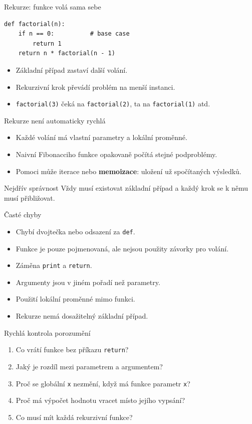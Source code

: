 \documentclass[aspectratio=169]{beamer}
\newcommand{\term}[1]{\textcolor{CodeBlue}{\textbf{#1}}}
\begin{document}
\begin{frame}[fragile]{Rekurze: funkce volá sama sebe}
\begin{lstlisting}[style=python]
def factorial(n):
    if n == 0:          # base case
        return 1
    return n * factorial(n - 1)
\end{lstlisting}
  \begin{itemize}
    \item Základní případ zastaví další volání.
    \item Rekurzivní krok převádí problém na menší instanci.
    \item \texttt{factorial(3)} čeká na \texttt{factorial(2)}, ta na \texttt{factorial(1)} atd.
  \end{itemize}
\end{frame}

\begin{frame}{Rekurze není automaticky rychlá}
  \begin{itemize}
    \item Každé volání má vlastní parametry a lokální proměnné.
    \item Naivní Fibonacciho funkce opakovaně počítá stejné podproblémy.
    \item Pomoci může iterace nebo \term{memoizace}: uložení už spočítaných výsledků.
  \end{itemize}
  \begin{alertblock}{Nejdřív správnost}
    Vždy musí existovat základní případ a každý krok se k němu musí přibližovat.
  \end{alertblock}
\end{frame}

\begin{frame}{Časté chyby}
  \begin{itemize}
    \item Chybí dvojtečka nebo odsazení za \texttt{def}.
    \item Funkce je pouze pojmenovaná, ale nejsou použity závorky pro volání.
    \item Záměna \texttt{print} a \texttt{return}.
    \item Argumenty jsou v jiném pořadí než parametry.
    \item Použití lokální proměnné mimo funkci.
    \item Rekurze nemá dosažitelný základní případ.
  \end{itemize}
\end{frame}

\begin{frame}{Rychlá kontrola porozumění}
  \begin{enumerate}
    \item Co vrátí funkce bez příkazu \texttt{return}?
    \item Jaký je rozdíl mezi parametrem a argumentem?
    \item Proč se globální \texttt{x} nezmění, když má funkce parametr \texttt{x}?
    \item Proč má výpočet hodnotu vracet místo jejího vypsání?
    \item Co musí mít každá rekurzivní funkce?
  \end{enumerate}
\end{frame}
\end{document}
